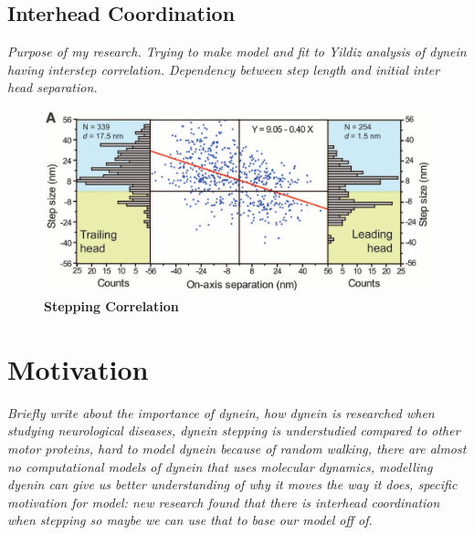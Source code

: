 \subsection{Interhead Coordination}
\textit{Purpose of my research. Trying to make model and fit to Yildiz analysis of dynein having interstep correlation. Dependency between step length and initial inter head separation.}

\begin{figure}[H]
	\centering
	\includegraphics[width=1\columnwidth]{Figures/Yildiz_stepping.png}
	\caption[Stepping Correlation]{\textbf{Stepping Correlation}  \cite{Dewitt2012} }
	\label{fig:YildizCorrelation}
\end{figure}




\section{Motivation}
\textit{Briefly write about the importance of dynein, how dynein is researched when studying neurological diseases, dynein stepping is understudied compared to other motor proteins, hard to model dynein because of random walking, there are almost no computational models of dynein that uses molecular dynamics, modelling dyenin can give us better understanding of why it moves the way it does, specific motivation for model: new research found that there is interhead coordination when stepping so maybe we can use that to base our model off of.}
\par

